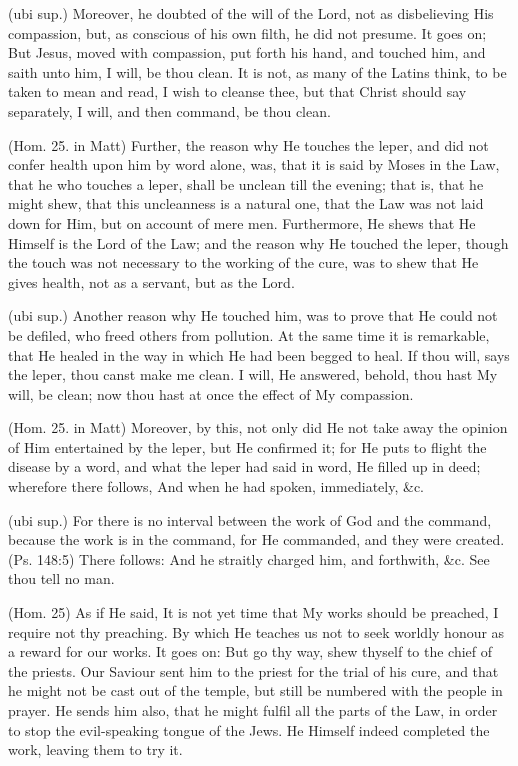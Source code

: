  (ubi sup.) Moreover, he doubted of the will of the Lord, not as disbelieving His compassion, but, as conscious of his own filth, he did not presume. It goes on; But Jesus, moved with compassion, put forth his hand, and touched him, and saith unto him, I will, be thou clean. It is not, as many of the Latins think, to be taken to mean and read, I wish to cleanse thee, but that Christ should say separately, I will, and then command, be thou clean.

 (Hom. 25. in Matt) Further, the reason why He touches the leper, and did not confer health upon him by word alone, was, that it is said by Moses in the Law, that he who touches a leper, shall be unclean till the evening; that is, that he might shew, that this uncleanness is a natural one, that the Law was not laid down for Him, but on account of mere men. Furthermore, He shews that He Himself is the Lord of the Law; and the reason why He touched the leper, though the touch was not necessary to the working of the cure, was to shew that He gives health, not as a servant, but as the Lord.

 (ubi sup.) Another reason why He touched him, was to prove that He could not be defiled, who freed others from pollution. At the same time it is remarkable, that He healed in the way in which He had been begged to heal. If thou will, says the leper, thou canst make me clean. I will, He answered, behold, thou hast My will, be clean; now thou hast at once the effect of My compassion.

 (Hom. 25. in Matt) Moreover, by this, not only did He not take away the opinion of Him entertained by the leper, but He confirmed it; for He puts to flight the disease by a word, and what the leper had said in word, He filled up in deed; wherefore there follows, And when he had spoken, immediately, \&c.

 (ubi sup.) For there is no interval between the work of God and the command, because the work is in the command, for He commanded, and they were created. (Ps. 148:5) There follows: And he straitly charged him, and forthwith, \&c. See thou tell no man.

 (Hom. 25) As if He said, It is not yet time that My works should be preached, I require not thy preaching. By which He teaches us not to seek worldly honour as a reward for our works. It goes on: But go thy way, shew thyself to the chief of the priests. Our Saviour sent him to the priest for the trial of his cure, and that he might not be cast out of the temple, but still be numbered with the people in prayer. He sends him also, that he might fulfil all the parts of the Law, in order to stop the evil-speaking tongue of the Jews. He Himself indeed completed the work, leaving them to try it.

